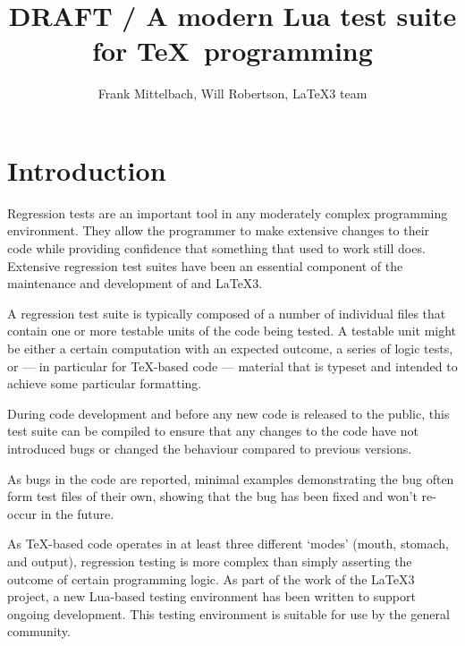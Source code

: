 \documentclass[a4paper]{ltugboat}
\begin{document}
\title{DRAFT / A modern Lua test suite for \TeX\ programming}
\author{Frank Mittelbach, Will Robertson, \LaTeX3 team}
\address{%
  Mainz,  Germany\\
  Adelaide, Australia}



\newcommand\drivername{build.lua}
\newcommand\makename{l3build.lua}
\newcommand\execname{texlua \drivername}
\newcommand\compdirname{test/}

\setcounter{page}{777}

\newcommand\pdfTeX{pdf\TeX}
\newcommand\luaTeX{Lua\TeX}

\maketitle

\tableofcontents

\section{Introduction}

Regression tests are an important tool in any moderately complex
programming environment.  They allow the programmer to make extensive
changes to their code while providing confidence that something that
used to work still does.  Extensive regression test suites have been
an essential component of the maintenance and development of \LaTeXe{}
and \LaTeX3.

A regression test suite is typically composed of a number of
individual files that contain one or more testable units of the code
being tested. A testable unit might be either a certain computation
with an expected outcome, a series of logic tests, or --- in
particular for \TeX{}-based code --- material that is typeset and
intended to achieve some particular formatting.

During code development and before any new code is released to the
public, this test suite can be compiled to ensure that any changes to
the code have not introduced bugs or changed the behaviour compared to
previous versions.

As bugs in the code are reported, minimal examples demonstrating the
bug often form test files of their own, showing that the bug has been
fixed and won't re-occur in the future.

As \TeX{}-based code operates in at least three different `modes'
(mouth, stomach, and output), regression testing is more complex than
simply asserting the outcome of certain programming logic.  As part of
the work of the \LaTeX3 project, a new Lua-based testing environment
has been written to support ongoing development.  This testing
environment is suitable for use by the general community.
\end{document}
